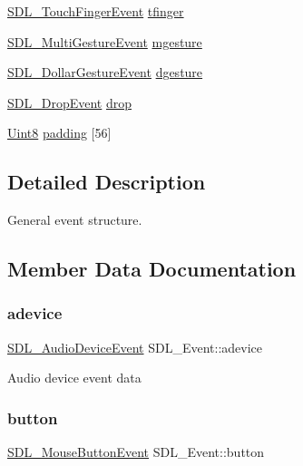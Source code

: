 \begin{DoxyCompactItemize}
\mbox{\hyperlink{struct_s_d_l___touch_finger_event}{S\+D\+L\+\_\+\+Touch\+Finger\+Event}} \mbox{\hyperlink{union_s_d_l___event_ab18d7d60794cb056948ffa58541bc3c5}{tfinger}}
\item 
\mbox{\hyperlink{struct_s_d_l___multi_gesture_event}{S\+D\+L\+\_\+\+Multi\+Gesture\+Event}} \mbox{\hyperlink{union_s_d_l___event_ac19b3c6a6b5181a51eb4fbe2cbe726a9}{mgesture}}
\item 
\mbox{\hyperlink{struct_s_d_l___dollar_gesture_event}{S\+D\+L\+\_\+\+Dollar\+Gesture\+Event}} \mbox{\hyperlink{union_s_d_l___event_a4481167b9f8549aeb254e97ca812e74d}{dgesture}}
\item 
\mbox{\hyperlink{struct_s_d_l___drop_event}{S\+D\+L\+\_\+\+Drop\+Event}} \mbox{\hyperlink{union_s_d_l___event_acff77bccbca65abbb876360a3f5209c9}{drop}}
\item 
\mbox{\hyperlink{_s_d_l__stdinc_8h_a2944638813a090aa23e62f4da842c3e2}{Uint8}} \mbox{\hyperlink{union_s_d_l___event_aabb599570edfa54aad6255c1f24f2ad2}{padding}} \mbox{[}56\mbox{]}
\end{DoxyCompactItemize}


\subsection{Detailed Description}
General event structure. 

\subsection{Member Data Documentation}
\mbox{\label{union_s_d_l___event_a111e01fcac4fd8e251a6058ff9f17e72}} 
\subsubsection{\texorpdfstring{adevice}{adevice}}
{\footnotesize\ttfamily \mbox{\hyperlink{struct_s_d_l___audio_device_event}{S\+D\+L\+\_\+\+Audio\+Device\+Event}} S\+D\+L\+\_\+\+Event\+::adevice}

Audio device event data \mbox{\label{union_s_d_l___event_ab6da2fa2687e5f849f270adecc64785f}} 
\subsubsection{\texorpdfstring{button}{button}}
{\footnotesize\ttfamily \mbox{\hyperlink{struct_s_d_l___mouse_button_event}{S\+D\+L\+\_\+\+Mouse\+Button\+Event}} S\+D\+L\+\_\+\+Event\+::button}

